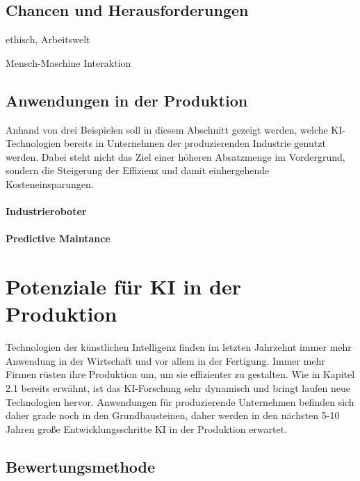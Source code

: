 \documentclass[a4paper,12pt, german]{report}
\begin{document}
\section{Chancen und Herausforderungen}


ethisch, Arbeitswelt

Mensch-Maschine Interaktion

\section{Anwendungen in der Produktion}

Anhand von drei Beispielen soll in diesem Abschnitt gezeigt werden, welche KI-Technologien bereits in Unternehmen der produzierenden Industrie genutzt werden. Dabei steht nicht das Ziel einer höheren Absatzmenge im Vordergrund, sondern die Steigerung der Effizienz und damit einhergehende Kosteneinsparungen.

\subsubsection{Industrieroboter}

\subsubsection{Predictive Maintance}



\chapter{Potenziale für KI in der Produktion}
Technologien der künstlichen Intelligenz finden im letzten Jahrzehnt immer mehr Anwendung in der Wirtschaft und vor allem in der Fertigung. Immer mehr Firmen rüsten ihre Produktion um, um sie effizienter zu gestalten. Wie in Kapitel 2.1 bereits erwähnt, ist das KI-Forschung sehr dynamisch und bringt laufen neue Technologien hervor. Anwendungen für produzierende Unternehmen befinden sich daher grade noch in den Grundbausteinen, daher werden in den nächsten 5-10 Jahren große Entwicklungsschritte KI in der Produktion erwartet.



\section{Bewertungsmethode}
\end{document}
